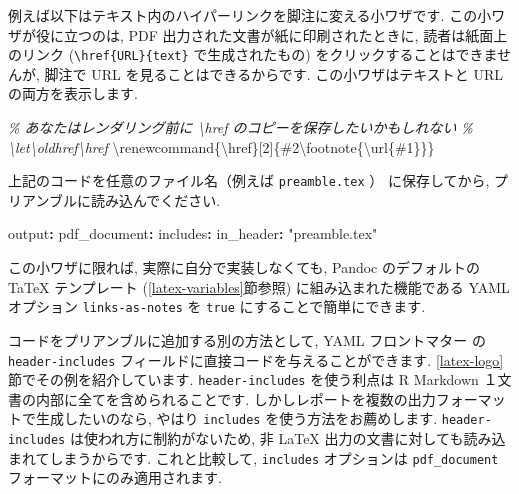 \documentclass[
  11pt,
  lualatex,
  ja=standard]{bxjsreport}
\newenvironment{Shaded}{\begin{snugshade}}{\end{snugshade}}
\newcommand{\AttributeTok}[1]{\textcolor[rgb]{0.77,0.63,0.00}{#1}}
\newcommand{\CommentTok}[1]{\textcolor[rgb]{0.56,0.35,0.01}{\textit{#1}}}
\newcommand{\ExtensionTok}[1]{#1}
\newcommand{\FunctionTok}[1]{\textcolor[rgb]{0.00,0.00,0.00}{#1}}
\newcommand{\KeywordTok}[1]{\textcolor[rgb]{0.13,0.29,0.53}{\textbf{#1}}}
\newcommand{\NormalTok}[1]{#1}
\newcommand{\StringTok}[1]{\textcolor[rgb]{0.31,0.60,0.02}{#1}}
\begin{document}
例えば以下はテキスト内のハイパーリンクを脚注に変える小ワザです. この小ワザが役に立つのは, PDF 出力された文書が紙に印刷されたときに, 読者は紙面上のリンク (\texttt{\textbackslash{}href\{URL\}\{text\}} で生成されたもの) をクリックすることはできませんが, 脚注で URL を見ることはできるからです. この小ワザはテキストと URL の両方を表示します.

\begin{Shaded}
\begin{Highlighting}[]
\CommentTok{\% あなたはレンダリング前に \textbackslash{}href のコピーを保存したいかもしれない}
\CommentTok{\% \textbackslash{}let\textbackslash{}oldhref\textbackslash{}href}
\FunctionTok{\textbackslash{}renewcommand}\NormalTok{\{}\ExtensionTok{\textbackslash{}href}\NormalTok{\}[2]\{\#2}\FunctionTok{\textbackslash{}footnote}\NormalTok{\{}\FunctionTok{\textbackslash{}url}\NormalTok{\{\#1\}\}\}}
\end{Highlighting}
\end{Shaded}

上記のコードを任意のファイル名（例えば \texttt{preamble.tex} ） に保存してから, プリアンブルに読み込んでください.

\begin{Shaded}
\begin{Highlighting}[]
\FunctionTok{output}\KeywordTok{:}
\AttributeTok{  }\FunctionTok{pdf\_document}\KeywordTok{:}
\AttributeTok{    }\FunctionTok{includes}\KeywordTok{:}
\AttributeTok{      }\FunctionTok{in\_header}\KeywordTok{:}\AttributeTok{ }\StringTok{"preamble.tex"}
\end{Highlighting}
\end{Shaded}

この小ワザに限れば, 実際に自分で実装しなくても, Pandoc のデフォルトの TaTeX テンプレート (\ref{latex-variables}節参照) に組み込まれた機能である YAML オプション \texttt{links-as-notes} を \texttt{true} にすることで簡単にできます.

コードをプリアンブルに追加する別の方法として, YAML フロントマター の \texttt{header-includes} フィールドに直接コードを与えることができます. \ref{latex-logo}節でその例を紹介しています. \texttt{header-includes} を使う利点は R Markdown １文書の内部に全てを含められることです. しかしレポートを複数の出力フォーマットで生成したいのなら, やはり \texttt{includes} を使う方法をお薦めします. \texttt{header-includes} は使われ方に制約がないため, 非 LaTeX 出力の文書に対しても読み込まれてしまうからです. これと比較して, \texttt{includes} オプションは \texttt{pdf\_document} フォーマットにのみ適用されます.
\end{document}
